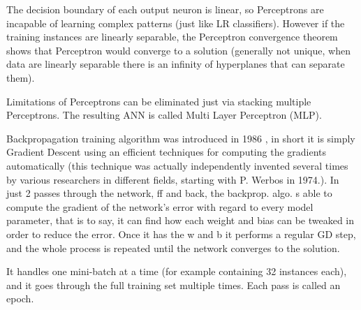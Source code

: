 \documentclass[9pt,twocolumn,twoside]{pnas-new}
\begin{document}
The decision boundary of each output neuron is linear, so Perceptrons are incapable of learning complex patterns (just like LR classifiers). However if the training instances are linearly separable, the Perceptron convergence theorem shows that Perceptron would converge to a solution (generally not unique, when data are linearly separable there is an infinity of hyperplanes that can separate them).

Limitations of Perceptrons can be eliminated just via stacking multiple Perceptrons.
The resulting ANN is called Multi Layer Perceptron (MLP).

Backpropagation training algorithm was introduced in 1986 \cite{rumellhart1986learning}, in short it is simply Gradient Descent using an efficient techniques for computing the gradients automatically (this technique was actually independently invented several times by various researchers in different fields, starting with P. Werbos in 1974.). 
In just 2 passes through the network, ff and back, the backprop. algo. s able to compute the gradient of the network's error with regard to every model parameter, that is to say, it can find how each weight and bias can be tweaked in order to reduce the error. Once it has the w and b it performs a regular GD step, and the whole process is repeated until the network converges to the solution.

It handles one mini-batch at a time (for example containing 32 instances each), and it goes through the full training set multiple times. Each pass is called an epoch.
\end{document}

